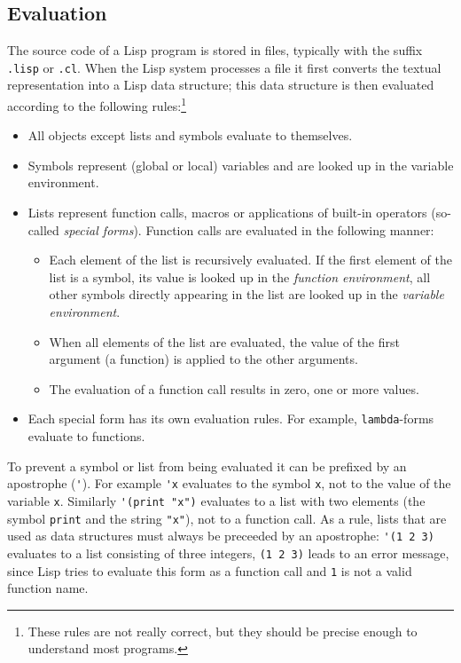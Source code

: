 \documentclass[a4paper]{amsart}
\begin{document}
\subsection{Evaluation}
\label{sec:evaluation}

The source code of a Lisp program is stored in files, typically with
the suffix \verb|.lisp| or \verb|.cl|.  When the Lisp system processes
a file it first converts the textual representation into a Lisp data
structure; this data structure is then evaluated according to the
following rules:\footnote{These rules are not really correct, but they
  should be precise enough to understand most programs.}
\begin{itemize}
\item All objects except lists and symbols evaluate to themselves.
\item Symbols represent (global or local) variables and are looked up
  in the variable environment.
\item Lists represent function calls, macros or applications of
  built-in operators (so-called \emph{special forms}).  Function calls
  are evaluated in the following manner:
  \begin{itemize}
  \item Each element of the list is recursively evaluated.  If the
    first element of the list is a symbol, its value is looked up in
    the \emph{function environment}, all other symbols directly
    appearing in the list are looked up in the \emph{variable
      environment}.
  \item When all elements of the list are evaluated, the value of the
    first argument (a function) is applied to the other arguments.
  \item The evaluation of a function call results in zero, one or more
    values.
  \end{itemize}
\item Each special form has its own evaluation rules.  For example,
  \texttt{lambda}-forms evaluate to functions.
\end{itemize}

To prevent a symbol or list from being evaluated it can be prefixed by
an apostrophe (\verb|'|).  For example \verb|'x| evaluates to the
symbol \texttt{x}, not to the value of the variable \texttt{x}.
Similarly \verb|'(print "x")| evaluates to a list with two elements
(the symbol \texttt{print} and the string \verb|"x"|), not to a
function call.  As a rule, lists that are used as data structures must
always be preceeded by an apostrophe: \verb|'(1 2 3)| evaluates to a
list consisting of three integers, \verb|(1 2 3)| leads to an error
message, since Lisp tries to evaluate this form as a function call and
\texttt{1} is not a valid function name.
\end{document}

